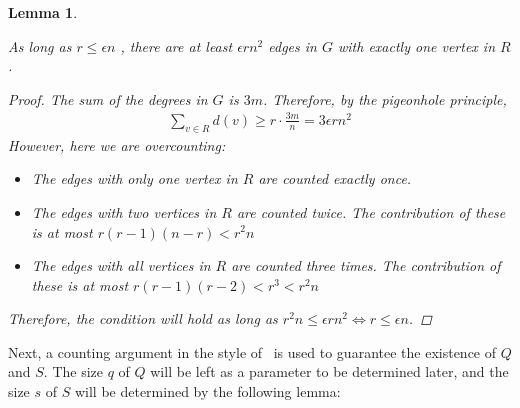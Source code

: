 \documentclass[12pt]{article}
\newtheorem{lemma}[thm]{Lemma}
\begin{document}
    \begin{lemma}\label{many_edges}

        As long as  $r \leq \epsilon n$ ,
        there are at least $\epsilon r n^2$ edges in $G$ with exactly one vertex in $R$.

        \begin{proof}
            The sum of the degrees in $G$ is $3m$.
            Therefore, by the pigeonhole principle,
            \begin{align*} 
                \sum_{v \in R} d(v) \geq r \cdot \frac{3m}{n} = 3 \epsilon r n^2
            \end{align*}
            However, here we are overcounting:
            \begin{itemize}
                \item The edges with only one vertex in $R$ are counted exactly once.
                \item The edges with two vertices in $R$ are counted twice.
                The contribution of these is at most $r(r-1)(n-r) < r^{2}n$
                \item The edges with all vertices in $R$ are counted three times.
                The contribution of these is at most $r(r-1)(r-2) < r^3 < r^{2}n$
            \end{itemize}

            Therefore, the condition will hold as long as
            $r^{2}n \leq \epsilon r n^2 \iff r \leq \epsilon n$.
        \end{proof}
    \end{lemma}

    Next, a counting argument in the style of~\cite{Kovari1954}
    is used to guarantee the existence of $Q$ and $S$.
    The size $q$ of $Q$ will be left as a parameter to be determined later,
    and the size $s$ of $S$ will be determined by the following lemma:
\end{document}
